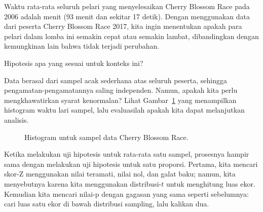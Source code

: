 Waktu rata-rata seluruh pelari yang menyelesaikan Cherry Blossom Race pada 2006 adalah \cherryblossomnull{} menit (93 menit dan sekitar 17 detik). Dengan menggunakan data dari \cherryblossomn{} peserta Cherry Blossom Race 2017, kita ingin menentukan apakah para pelari dalam lomba ini semakin cepat atau semakin lambat, dibandingkan dengan kemungkinan lain bahwa tidak terjadi perubahan.

\begin{exercisewrap}
\begin{nexercise}
Hipotesis apa yang sesuai untuk konteks ini?\footnotemark{}
\end{nexercise}
\end{exercisewrap}

\begin{exercisewrap}
\begin{nexercise}
Data berasal dari sampel acak sederhana atas seluruh peserta,
sehingga pengamatan-pengamatannya saling independen.
Namun, apakah kita perlu mengkhawatirkan syarat kenormalan?
Lihat Gambar~\ref{run10SampTimeHistogram} yang menampilkan histogram
waktu lari sampel, lalu evaluasilah apakah kita dapat
melanjutkan analisis.\footnotemark{}
\end{nexercise}
\end{exercisewrap}

\begin{figure}[h]
  \centering
  \caption{Histogram  untuk sampel data
      Cherry Blossom Race.}
  \label{run10SampTimeHistogram}
\end{figure}

Ketika melakukan uji hipotesis untuk rata-rata satu sampel,
prosesnya hampir sama dengan melakukan uji hipotesis
untuk satu proporsi.
Pertama, kita mencari skor-Z menggunakan nilai teramati,
nilai nol, dan galat baku;
namun, kita menyebutnya  karena kita menggunakan
distribusi-$t$ untuk menghitung luas ekor.
Kemudian kita mencari nilai-p dengan gagasan yang sama seperti
sebelumnya: cari luas satu ekor di bawah distribusi
sampling, lalu kalikan dua.

